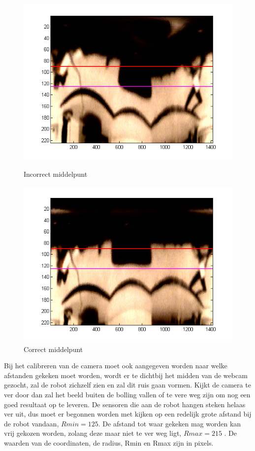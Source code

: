 \documentclass[a4paper]{article}
\begin{document}
\begin{figure}[htbp]
  \begin{minipage}[b]{0.5\linewidth}
    \centering
    \includegraphics[width=\linewidth]{img/incorrect_center.png}
    \caption{Incorrect middelpunt}
    \label{fig:incorrectcenter}
  \end{minipage}
  \hspace{0.5cm}
  \begin{minipage}[b]{0.5\linewidth}
    \centering
    \includegraphics[width=\linewidth]{img/correct_center.png}
    \caption{Correct middelpunt}
    \label{fig:correctcenter}
  \end{minipage}
\end{figure}
Bij het calibreren van de camera moet ook aangegeven worden naar welke afstanden gekeken moet worden, wordt er te dichtbij het midden van de webcam gezocht, zal de robot zichzelf zien en zal dit ruis gaan vormen. Kijkt de camera te ver door dan zal het beeld buiten de bolling vallen of te vere weg zijn om nog een goed resultaat op te leveren. De sensoren die aan de robot hangen steken helaas ver uit, dus moet er begonnen worden met kijken op een redelijk grote afstand bij de robot vandaan, $Rmin = 125$. De afstand tot waar gekeken mag worden kan vrij gekozen worden, zolang deze maar niet te ver weg ligt, $Rmax = 215$ . De waarden van de coordinaten, de radius, Rmin en Rmax zijn in pixels.
\end{document}
